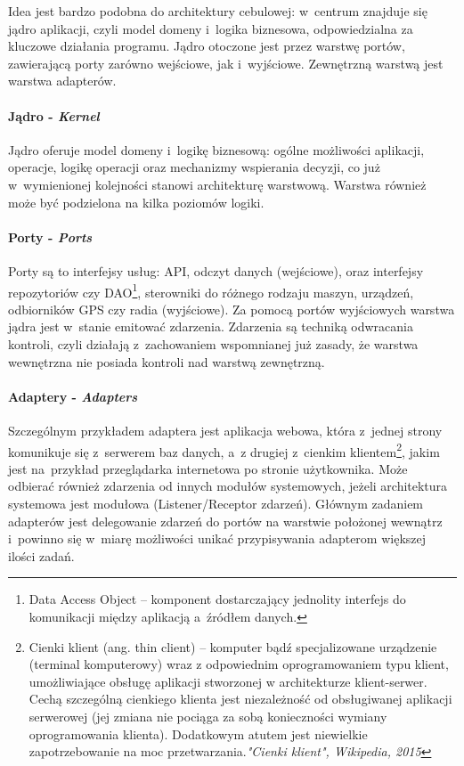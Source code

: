 Idea jest bardzo podobna do architektury cebulowej: w~centrum znajduje się jądro aplikacji, czyli model domeny i~logika biznesowa, odpowiedzialna za kluczowe działania programu. Jądro otoczone jest przez warstwę portów, zawierającą porty zarówno wejściowe, jak i~wyjściowe. Zewnętrzną warstwą jest warstwa adapterów.

\paragraph{Jądro - \textit{Kernel}}
Jądro oferuje model domeny i~logikę biznesową: ogólne możliwości aplikacji, operacje, logikę operacji oraz mechanizmy wspierania decyzji, co już w~wymienionej kolejności stanowi architekturę warstwową. Warstwa również może być podzielona na kilka poziomów logiki. 

\paragraph{Porty - \textit{Ports}}
Porty są to interfejsy usług: API, odczyt danych (wejściowe), oraz interfejsy repozytoriów czy DAO\footnote{Data Access Object – komponent dostarczający jednolity interfejs do komunikacji między aplikacją a~źródłem danych.}, sterowniki do różnego rodzaju maszyn, urządzeń, odbiorników GPS czy radia (wyjściowe). Za pomocą portów wyjściowych warstwa jądra jest w~stanie emitować zdarzenia. Zdarzenia są techniką odwracania kontroli, czyli działają z~zachowaniem wspomnianej już zasady, że warstwa wewnętrzna nie posiada kontroli nad warstwą zewnętrzną. 

\paragraph{Adaptery - \textit{Adapters}}
Szczególnym przykładem adaptera jest aplikacja webowa, która z~jednej strony komunikuje się z~serwerem baz danych, a~z drugiej z~cienkim klientem\footnote{Cienki klient (ang. thin client) – komputer bądź specjalizowane urządzenie (terminal komputerowy) wraz z odpowiednim oprogramowaniem typu klient, umożliwiające obsługę aplikacji stworzonej w architekturze klient-serwer. Cechą szczególną cienkiego klienta jest niezależność od obsługiwanej aplikacji serwerowej (jej zmiana nie pociąga za sobą konieczności wymiany oprogramowania klienta). Dodatkowym atutem jest niewielkie zapotrzebowanie na moc przetwarzania.\textit{"Cienki klient", Wikipedia, 2015}}, jakim jest na~przykład przeglądarka internetowa po stronie użytkownika. Może odbierać również zdarzenia od innych modułów systemowych, jeżeli architektura systemowa jest modułowa (Listener/Receptor zdarzeń). Głównym zadaniem adapterów jest delegowanie zdarzeń do portów na warstwie położonej wewnątrz i~powinno się w~miarę możliwości unikać przypisywania adapterom większej ilości zadań.

